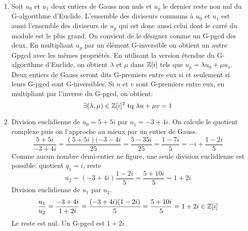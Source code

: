 \begin{enumerate}
\begin{enumerate}
  \item Soit $u_0$ et $u_1$ deux entiers de Gauss non nuls et $u_p$ le dernier reste non nul du G-algorithme d'Euclide. L'ensemble des diviseurs communs à $u_0$ et $u_1$ est aussi l'ensemble des diviseurs de $u_p$ qui est donc aussi celui dont le carré du module est le plus grand. On convient de le désigner comme un G-pgcd des deux. En multipliant $u_p$ par un élément G-inversible on obtient un autre Gpgcd avec les mêmes propriétés.\newline
  En utilisant la version étendue du G-algorithme d'Euclide, on obtient $\lambda$ et $\mu$ dans $\mathbb{Z}[i]$ tels que $u_p = \lambda u_0 + \mu u_1$.\newline
  Deux entiers de Gauss seront dits G-premiers entre eux si et seulement si leurs G-pgcd sont G-inversibles. Si $u$ et $v$ sont G-premiers entre eux, en multipliant par l'inverse du G-pgcd, on obtient:
\begin{displaymath}
  \exists(\lambda,\mu)\in \mathbb{Z}[i]^2\text{ tq } \lambda u + \mu v = 1
\end{displaymath}
  
  \item Division euclidienne de $u_0=5+5i$ par $u_1=-3+4i$. On calcule le quotient complexe puis on l'approche au mieux par un entier de Gauss.
\begin{displaymath}
\frac{5+5i}{-3+4i}=\frac{(5+5i)(-3-4i}{25}=\frac{5-35i}{25}=\frac{1-7i}{5}= -i +\frac{1-2i}{5}  
\end{displaymath}
Comme aucun nombre demi-entier ne figure, une seule division euclidienne est possible: quotient $q_1=i$, reste 
\begin{displaymath}
  u_2 = (-3+4i)\frac{1-2i}{5} = \frac{5+10i}{5} = 1+2i
\end{displaymath}
Division euclidienne de $u_1$ par $u_2$.
\begin{displaymath}
  \frac{u_1}{u_2}=\frac{-3+4i}{1+2i}=\frac{(-3+4i)(1-2i)}{5}=\frac{5+10i}{5}=1+2i\in \mathbb{Z}[i]
\end{displaymath}
Le reste est nul. Un G-pgcd est $1+2i$.
\end{enumerate}


\end{enumerate}
